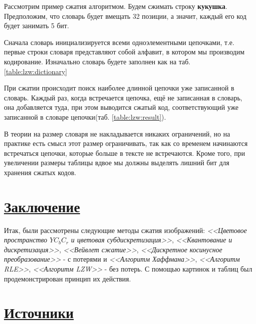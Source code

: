 Рассмотрим пример сжатия алгоритмом. Будем сжимать строку \textbf{кукушка}. Предположим, что словарь будет вмещать 32 позиции, а значит, каждый его код будет занимать 5 бит.

Сначала словарь инициализируется всеми одноэлементными цепочками, т.е. первые строки словаря представляют собой алфавит, в котором мы производим кодирование. Изначально словарь будете заполнен как на таб. \ref{table:lzw:dictionary}


При сжатии происходит поиск наиболее длинной цепочки уже записанной в словарь. Каждый раз, когда встречается цепочка, ещё не записанная в словарь, она добавляется туда, при этом выводится сжатый код, соответствующий уже записанной в словаре цепочки(таб. \ref{table:lzw:result}).


В теории на размер словаря не накладывается никаких ограничений, но на практике есть смысл этот размер ограничивать, так как со временем начинаются встречаться цепочки, которые больше в тексте не встречаются. Кроме того, при увеличении размеры таблицы вдвое мы должны выделять лишний бит для хранения сжатых кодов.
 


\section*{\hyperlink{toc}{Заключение}}

Итак, были рассмотрены следующие методы сжатия изображений: \textit{<<Цветовое пространство $YC_bC_r$ и цветовая субдискретизация>>}, \textit{<<Квантование и дискретизация>>}, \textit{<<Вейвлет сжатие>>}, \textit{<<Дискретное косинусное преобразование>>} - с потерями и \textit{<<Алгоритм Хаффмана>>}, \textit{<<Алгоритм RLE>>}, \textit{<<Алгоритм LZW>>} - без потерь. С помощью картинок и таблиц был продемонстрирован принцип их действия.

\section*{\hyperlink{toc}{Источники}}


